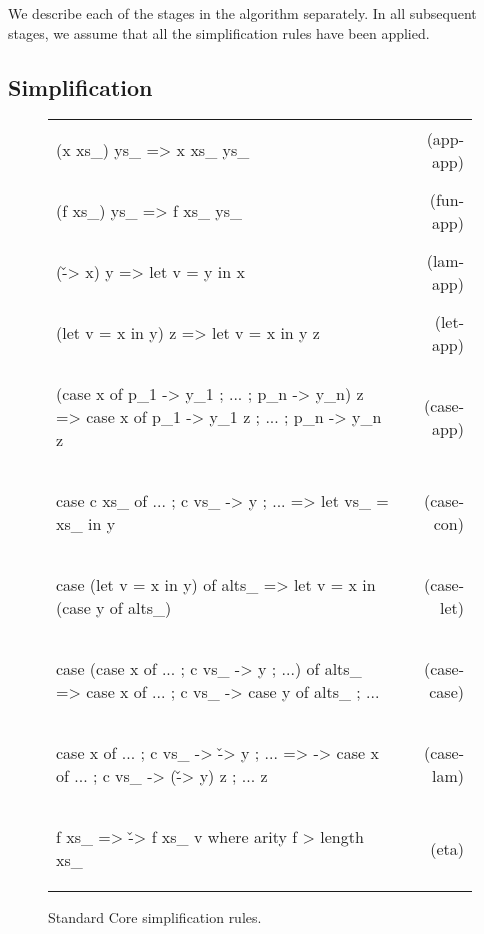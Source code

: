 \documentclass[preprint]{sigplanconf}
\newcommand{\simp}[2]{\vspace{-7mm} #2 & (#1) \\}
\newenvironment{simplify}
    {\noindent
     \begin{flushright}
     \begin{tabular}{p{6.5cm}r}
    }
    {\end{tabular}
     \vspace{-7mm}
     \end{flushright}
    }
\begin{document}
We describe each of the stages in the algorithm separately. In all subsequent stages, we assume that all the simplification rules have been applied.


\subsection{Simplification}

\begin{figure}
\begin{simplify}

\simp{app-app}{
\ignore\begin{code}
(x xs_) ys_
    => x xs_ ys_
\end{code}}

\simp{fun-app}{
\ignore\begin{code}
(f xs_) ys_
    => f xs_ ys_
\end{code}}

\simp{lam-app}{
\ignore\begin{code}
(\v -> x) y
    => let v = y in x
\end{code}}

\simp{let-app}{
\ignore\begin{code}
(let v = x in y) z
    => let v = x in y z
\end{code}}

\simp{case-app}{
\ignore\begin{code}
(case x of {p_1 -> y_1 ; ... ; p_n -> y_n}) z
    => case x of {p_1 -> y_1 z ; ... ; p_n -> y_n z}
\end{code}}

\simp{case-con}{
\ignore\begin{code}
case c xs_ of {... ; c vs_ -> y ; ...}
    => let vs_ = xs_ in y
\end{code}}

\simp{case-let}{
\ignore\begin{code}
case (let v = x in y) of alts_
    => let v = x in (case y of alts_)
\end{code}}

\simp{case-case}{
\ignore\begin{code}
case (case x of {... ; c vs_ -> y ; ...}) of alts_
    => case x of {... ; c vs_ -> case y of alts_ ; ...}
\end{code}}

\simp{case-lam}{
\ignore\begin{code}
case x of {... ; c vs_ -> \v -> y ; ...}
    => \z -> case x of {... ; c vs_ -> (\v -> y) z ; ...} z
\end{code}}

\simp{eta}{
\ignore\begin{code}
f xs_
    => \v -> f xs_ v
    where arity f > length xs_
\end{code}}

\end{simplify}
\caption{Standard Core simplification rules.}
\label{fig:simplify}
\end{figure}
\end{document}
